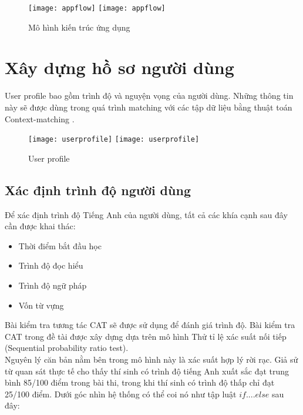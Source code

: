 \begin{figure}[H]
  \begin{center}
    \ifpdf
      \texttt{[image: appflow]}
    \else
      \texttt{[image: appflow]}
    \fi
    \caption{Mô hình kiến trúc ứng dụng}
    \label{Appflow}
  \end{center}
\end{figure}

\section{Xây dựng hồ sơ người dùng}
User profile bao gồm trình độ và nguyện vọng của người dùng. Những thông tin này sẽ được dùng trong quá trình matching với các tập dữ liệu bằng thuật toán Context-matching . \\

\begin{figure}[H]
  \begin{center}
    \ifpdf
      \texttt{[image: userprofile]}
    \else
      \texttt{[image: userprofile]}
    \fi
    \caption{User profile}
    \label{Userprofile}
  \end{center}
\end{figure}

\subsection{Xác định trình độ người dùng}

Để xác định trình độ Tiếng Anh của người dùng, tất cả các khía cạnh sau đây cần được khai thác:
\begin{itemize}
\item Thời điểm bắt đầu học
\item Trình độ đọc hiểu
\item Trình độ ngữ pháp
\item Vốn từ vựng
\end{itemize}

Bài kiểm tra tương tác CAT sẽ được sử dụng để đánh giá trình độ. Bài kiểm tra CAT trong đề tài được xây dựng dựa trên mô hình Thử tỉ lệ xác suất nối tiếp (Sequential probability ratio test). \\

Nguyên lý căn bản nằm bên trong mô hình này là xác suất hợp lý rời rạc. Giả sử từ quan sát thực tế cho thấy thí sinh có trình độ tiếng Anh xuất sắc đạt trung bình 85/100 điểm trong bài thi, trong khi thí sinh có trình độ thấp chỉ đạt 25/100 điểm. Dưới góc nhìn hệ thống có thể coi nó như tập luật $if....else$ sau đây:\\

